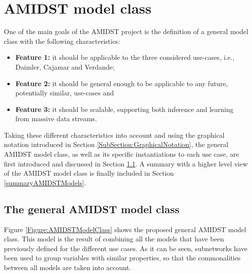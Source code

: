 \section{AMIDST model class}\label{section:AMIDSTmodelClass}

One of the main goals of the AMIDST project is the definition of a general model class with the following characteristics: 

\begin{itemize}
\item \textbf{Feature 1:} it should be applicable to the three considered use-cases, i.e., Daimler, Cajamar and Verdande;

\item \textbf{Feature 2:}  it should be general enough to be applicable to any future, potentially similar, use-cases and

\item \textbf{Feature 3:} it should be scalable, supporting both inference and learning from massive data streams.

\end{itemize}

Taking these different characteristics into account and using the graphical notation introduced in Section \ref{SubSection:GraphicalNotation}, the general AMIDST model class, as well as its specific instantiations to each use case, are first introduced and discussed in Section \ref{GeneralModelClass}. A summary with a higher level view of the AMIDST model class is finally included in Section \ref{summaryAMIDSTModels}.

\subsection{The general AMIDST model class}\label{GeneralModelClass}

Figure \ref{Figure:AMIDSTModelClass} shows the proposed general AMIDST model class. This model is the result of combining all the models that have been previously defined for the different use cases. As it can be seen, subnetworks have been used to group variables with similar properties, so that the commonalities between all models are taken into account. 

